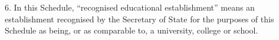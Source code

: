 \documentclass[12pt,a4paper]{article}
\begin{document}
%
%
%
%
%
%

%

6.  In this Schedule, “recognised educational establishment” means an establishment recognised by the Secretary of State for the purposes of this Schedule as being, or as comparable to, a university, college or school.
\end{document}
